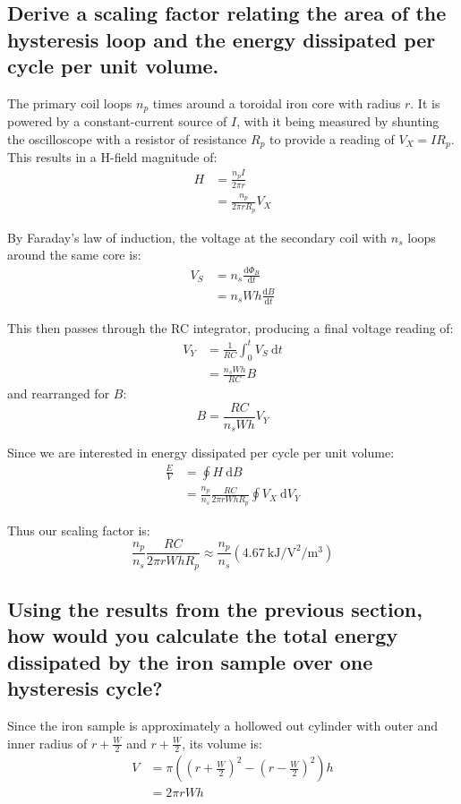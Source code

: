 \documentclass[a4paper]{scrartcl}
\begin{document}
\subsection{Derive a scaling factor relating the area of the hysteresis loop and the energy dissipated per cycle per unit volume.}
The primary coil loops \(n_p\) times around a toroidal iron core with radius \(r\). It is powered by a constant-current source of \(I\), with it being measured by shunting the oscilloscope with a resistor of resistance \(R_p\) to provide a reading of \(V_X = I R_p\). This results in a H-field magnitude of:
\begin{align*}
    H &= \frac{n_p I}{2 \pi r} \\
    &= \frac{n_p}{2 \pi r R_p} V_X
\end{align*}

By Faraday's law of induction, the voltage at the secondary coil with \(n_s\) loops around the same core is:
\begin{align*}
    V_S &= n_s \frac{\mathrm{d}\Phi_B}{\mathrm{d}t} \\
    &= n_s W h \frac{\mathrm{d}B}{\mathrm{d}t}
\end{align*}

This then passes through the RC integrator, producing a final voltage reading of:
\begin{align*}
    V_Y &= \frac{1}{R C} \int_0^t V_S \:\mathrm{d}t \\
    &= \frac{n_s W h}{R C} B
\end{align*}
and rearranged for \(B\):
\[B = \frac{R C}{n_s W h} V_Y\]

Since we are interested in energy dissipated per cycle per unit volume:
\begin{align*}
    \frac{E}{V} &= \oint H \:\mathrm{d}B \\
    &= \frac{n_p}{n_s}\frac{R C}{2 \pi r W h R_p} \oint V_X \:\mathrm{d}V_Y
\end{align*}

Thus our scaling factor is:
\[\frac{n_p}{n_s}\frac{R C}{2 \pi r W h R_p} \approx \frac{n_p}{n_s} (\SI{4.67}{\kilo\joule\per\volt\squared\per\metre\cubed})\]

\subsection{Using the results from the previous section, how would you calculate the total energy dissipated by the iron sample over one hysteresis cycle?}
Since the iron sample is approximately a hollowed out cylinder with outer and inner radius of \(r + \frac{W}{2}\) and \(r + \frac{W}{2}\), its volume is:
\begin{align*}
    V &= \pi \left(\left(r + \frac{W}{2}\right)^2 - \left(r - \frac{W}{2}\right)^2\right) h \\
    &= 2 \pi r W h
\end{align*}
\end{document}
